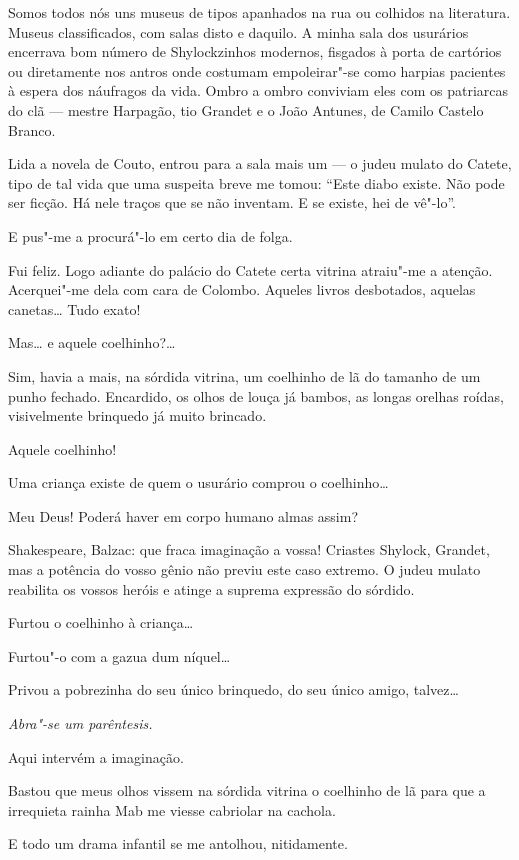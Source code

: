 Somos todos nós uns museus de tipos apanhados na rua ou colhidos na
literatura. Museus classificados, com salas disto e daquilo. A minha
sala dos usurários encerrava bom número de Shylockzinhos modernos,
fisgados à porta de cartórios ou diretamente nos antros onde costumam
empoleirar"-se como harpias pacientes à espera dos náufragos da vida.
Ombro a ombro conviviam eles com os patriarcas do clã --- mestre
Harpagão, tio Grandet e o João Antunes, de Camilo Castelo Branco.

Lida a novela de Couto, entrou para a sala mais um --- o judeu mulato do
Catete, tipo de tal vida que uma suspeita breve me tomou: ``Este diabo
existe. Não pode ser ficção. Há nele traços que se não inventam. E se
existe, hei de vê"-lo''.

E pus"-me a procurá"-lo em certo dia de folga.

Fui feliz. Logo adiante do palácio do Catete certa vitrina atraiu"-me a
atenção. Acerquei"-me dela com cara de Colombo. Aqueles livros
desbotados, aquelas canetas\ldots{} Tudo exato!

Mas\ldots{} e aquele coelhinho?\ldots{}

Sim, havia a mais, na sórdida vitrina, um coelhinho de lã do tamanho de
um punho fechado. Encardido, os olhos de louça já bambos, as longas
orelhas roídas, visivelmente brinquedo já muito brincado.

Aquele coelhinho!

Uma criança existe de quem o usurário comprou o coelhinho\ldots{}

Meu Deus! Poderá haver em corpo humano almas assim?

Shakespeare, Balzac: que fraca imaginação a vossa! Criastes Shylock,
Grandet, mas a potência do vosso gênio não previu este caso extremo. O
judeu mulato reabilita os vossos heróis e atinge a suprema expressão do
sórdido.

Furtou o coelhinho à criança\ldots{}

Furtou"-o com a gazua dum níquel\ldots{}

Privou a pobrezinha do seu único brinquedo, do seu único amigo,
talvez\ldots{}

\emph{Abra"-se um parêntesis.}

Aqui intervém a imaginação.

Bastou que meus olhos vissem na sórdida vitrina o coelhinho de lã para
que a irrequieta rainha Mab me viesse cabriolar na cachola.

E todo um drama infantil se me antolhou, nitidamente.

